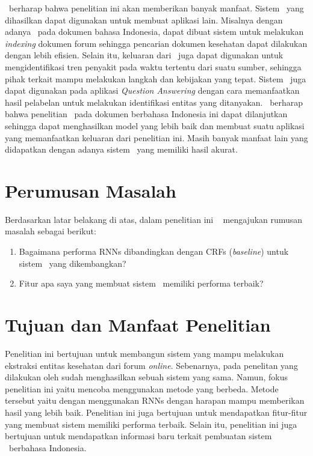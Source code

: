 	\Saya~berharap bahwa penelitian ini akan memberikan banyak manfaat. Sistem \mer~yang dihasilkan dapat digunakan untuk membuat aplikasi lain. Misalnya dengan adanya \mer~pada dokumen bahasa Indonesia, dapat dibuat sistem untuk melakukan \textit{indexing} dokumen forum sehingga pencarian dokumen kesehatan dapat dilakukan dengan lebih efisien. Selain itu, keluaran dari \mer~juga dapat digunakan untuk mengidentifikasi tren penyakit pada waktu tertentu dari suatu sumber, sehingga pihak terkait mampu melakukan langkah dan kebijakan yang tepat. Sistem \mer~juga dapat digunakan pada aplikasi \textit{Question Answering} \citep{abacha2011medical} dengan cara memanfaatkan hasil pelabelan untuk melakukan identifikasi entitas yang ditanyakan.  \Saya~berharap bahwa penelitian \mer~pada dokumen berbahasa Indonesia ini dapat dilanjutkan sehingga dapat menghasilkan model yang lebih baik dan membuat suatu aplikasi yang memanfaatkan keluaran dari penelitian ini. Masih banyak manfaat lain yang didapatkan dengan adanya sistem \mer~yang memiliki hasil akurat. 

\section{Perumusan Masalah}
Berdasarkan latar belakang di atas, dalam penelitian ini \saya~ mengajukan rumusan masalah sebagai berikut:
\begin{enumerate}
	\item Bagaimana performa RNNs dibandingkan dengan CRFs (\textit{baseline}) untuk sistem \mer~yang dikembangkan?
	\item Fitur apa saya yang membuat sistem \mer~memiliki performa terbaik?
\end{enumerate}

\section{Tujuan dan Manfaat Penelitian}
Penelitian ini bertujuan untuk membangun sistem yang mampu melakukan ekstraksi entitas kesehatan dari forum \textit{online}. Sebenarnya, pada penelitan yang dilakukan oleh \cite{skripsiKakRadit} sudah menghasilkan sebuah sistem yang sama. Namun, fokus penelitian ini yaitu mencoba menggunakan metode yang berbeda. Metode tersebut yaitu dengan menggunakan RNNs dengan harapan mampu memberikan hasil yang lebih baik. Penelitian ini juga bertujuan untuk mendapatkan fitur-fitur yang membuat sistem memiliki performa terbaik. Selain itu, penelitian ini juga bertujuan untuk mendapatkan informasi baru terkait pembuatan sistem \mer~berbahasa Indonesia.

